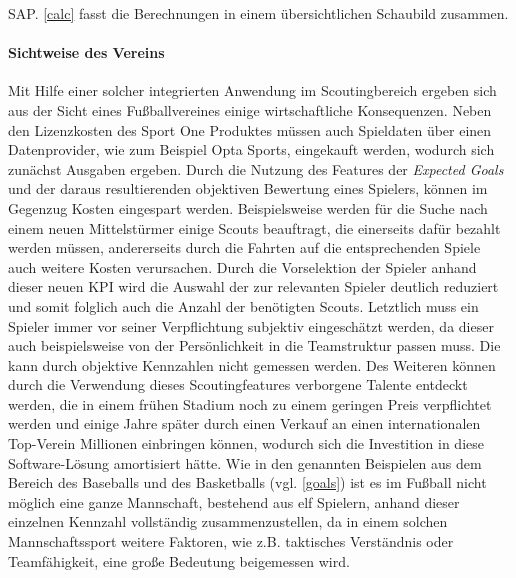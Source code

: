 SAP. \vref{calc} fasst die Berechnungen in einem übersichtlichen Schaubild zusammen.




\paragraph{Sichtweise des Vereins}
Mit Hilfe einer solcher integrierten Anwendung im Scoutingbereich ergeben sich aus der Sicht eines Fußballvereines einige wirtschaftliche Konsequenzen. Neben den Lizenzkosten des Sport One Produktes müssen auch Spieldaten über einen Datenprovider, wie zum Beispiel Opta Sports, eingekauft werden, wodurch sich zunächst Ausgaben ergeben. Durch die Nutzung des Features der \textit{Expected Goals} und der daraus resultierenden objektiven Bewertung eines Spielers, können im Gegenzug Kosten eingespart werden. Beispielsweise werden für die Suche nach einem neuen Mittelstürmer einige Scouts beauftragt, die einerseits dafür bezahlt werden müssen, andererseits durch die Fahrten auf die entsprechenden Spiele auch weitere Kosten verursachen. Durch die Vorselektion der Spieler anhand dieser neuen KPI wird die Auswahl der zur relevanten Spieler deutlich reduziert und somit folglich auch die Anzahl der benötigten Scouts. Letztlich muss ein Spieler immer vor seiner Verpflichtung subjektiv eingeschätzt werden, da dieser auch beispielsweise von der Persönlichkeit in die Teamstruktur passen muss. Die kann durch objektive Kennzahlen nicht gemessen werden. Des Weiteren können durch die Verwendung dieses Scoutingfeatures verborgene Talente entdeckt werden, die in einem frühen Stadium noch zu einem geringen Preis verpflichtet werden und einige Jahre später durch einen Verkauf an einen internationalen Top-Verein Millionen einbringen können, wodurch sich die Investition in diese Software-Lösung amortisiert hätte. Wie in den genannten Beispielen aus dem Bereich des Baseballs und des Basketballs (vgl. \vref{goals}) ist es im Fußball nicht möglich eine ganze Mannschaft, bestehend aus elf Spielern, anhand dieser einzelnen Kennzahl vollständig zusammenzustellen, da in einem solchen Mannschaftssport weitere Faktoren, wie z.B. taktisches Verständnis oder Teamfähigkeit, eine große Bedeutung beigemessen wird. 